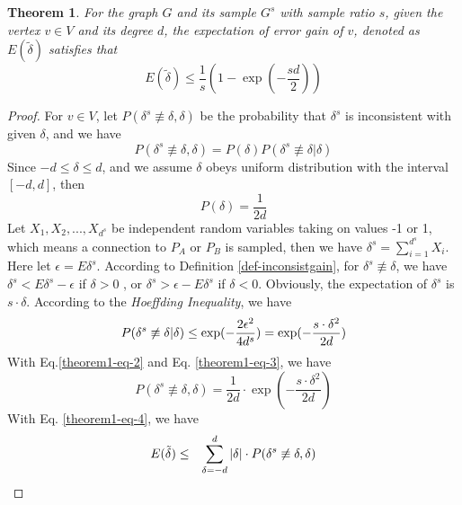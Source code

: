 \documentclass{sig-alternate-2013}
\begin{document}
\newtheorem{theorem}{Theorem}
\begin{theorem}\label{theorem-partition-error-a-vertex}
For the graph $G$ and its sample $G^s$ with sample ratio $s$, given the vertex $v \in V$ and its degree $d$, the expectation of error gain of $v$, denoted as $E(\tilde\delta)$ satisfies that
\begin{equation}\label{theorem1-eq-0}
E(\tilde\delta) \leq \frac{1}{s} (1-\exp(-\frac{s d}{2}))
\end{equation}
\end{theorem}
\begin{proof}
For $v \in V$, let $P(\delta^s \not\equiv \delta, \delta)$ be the probability that $\delta^s$ is inconsistent with given $\delta$, and we have
\begin{equation}\label{theorem1-eq-1}
P( \delta^s \not\equiv \delta, \delta) = P(\delta)P(\delta^s \not\equiv \delta |\delta)
\end{equation}
Since $-d\leq\delta\leq d$, and we assume $\delta$ obeys uniform distribution with the interval $[-d, d]$, then
\begin{equation}\label{theorem1-eq-2}
P(\delta)=\frac{1}{2d}
\end{equation}
Let $X_1, X_2,...,X_{d^s}$ be independent random variables taking on values -1 or 1, which means a connection to $P_A$ or $P_B$ is sampled, then we have $\delta^s = \sum_{i=1}^{d^s} X_i$. Here let $\epsilon = E\delta^s$.
According to Definition \ref{def-inconsistgain}, for $ \delta^s \not\equiv \delta$, we have $\delta^s < E\delta^s - \epsilon$ if $\delta > 0 $ , or $\delta^s > \epsilon - E\delta^s$ if $\delta < 0$.
Obviously, the expectation of $\delta^s$ is $s\cdot \delta$. According to the \textit{Hoeffding Inequality}, we have
\begin{equation}\label{theorem1-eq-3}
P(\delta^s \not\equiv \delta | \delta)  \leq  \exp(-\frac{2\epsilon^2}{4d^s}) \\
 = \exp(-\frac{s\cdot \delta^2}{2d})
\end{equation}
With Eq.\eqref{theorem1-eq-2} and Eq. \eqref{theorem1-eq-3}, we have
\begin{equation}\label{theorem1-eq-4}
P( \delta^s \not\equiv \delta, \delta) = \frac{1}{2d} \cdot \exp(-\frac{s\cdot \delta^2}{2d})
\end{equation}
With Eq. \eqref{theorem1-eq-4}, we have
\begin{eqnarray}\label{theorem1-eq-5}
E(\tilde\delta) &\leq& \sum_{\delta=-d}^{d} {|\delta| \cdot P( \delta^s \not\equiv \delta, \delta) } \notag \\

\end{eqnarray}
\end{proof}
\end{document}
